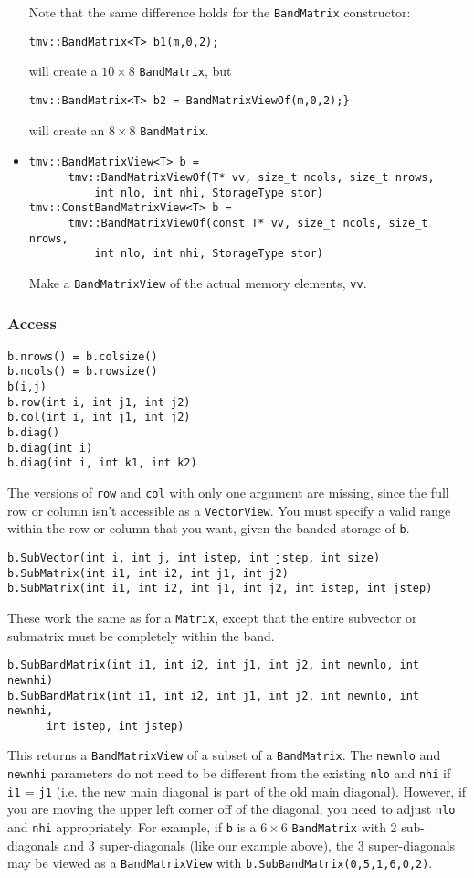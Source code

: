 \documentclass[twoside,letterpaper,11pt]{article}
\renewcommand{\tt}[1]{{\texttt {#1}}}
\begin{document}
\begin{itemize}
Note that the same difference holds for the \tt{BandMatrix} constructor:
\begin{verbatim}
tmv::BandMatrix<T> b1(m,0,2);
\end{verbatim}
will create a $10 \times 8$ \tt{BandMatrix}, but
\begin{verbatim}
tmv::BandMatrix<T> b2 = BandMatrixViewOf(m,0,2);}
\end{verbatim}
will create an $8 \times 8$ \tt{BandMatrix}.

\item
\begin{verbatim}
tmv::BandMatrixView<T> b = 
      tmv::BandMatrixViewOf(T* vv, size_t ncols, size_t nrows, 
          int nlo, int nhi, StorageType stor)
tmv::ConstBandMatrixView<T> b = 
      tmv::BandMatrixViewOf(const T* vv, size_t ncols, size_t nrows, 
          int nlo, int nhi, StorageType stor)
\end{verbatim}
Make a \tt{BandMatrixView} of the actual memory elements, \tt{vv}.

\end{itemize}

\subsubsection{Access}

\begin{verbatim}
b.nrows() = b.colsize()
b.ncols() = b.rowsize()
b(i,j)
b.row(int i, int j1, int j2)
b.col(int i, int j1, int j2)
b.diag()
b.diag(int i)
b.diag(int i, int k1, int k2)
\end{verbatim}
The versions of \tt{row} and \tt{col} with only one argument are
missing, since the full row or column isn't accessible as a \tt{VectorView}.
You must specify a valid range within the row or column that you want, 
given the banded storage of \tt{b}.

\begin{verbatim}
b.SubVector(int i, int j, int istep, int jstep, int size)
b.SubMatrix(int i1, int i2, int j1, int j2)
b.SubMatrix(int i1, int i2, int j1, int j2, int istep, int jstep)
\end{verbatim}
These work the same as for a \tt{Matrix}, except that the entire
subvector or submatrix must be completely within the band.

\begin{verbatim}
b.SubBandMatrix(int i1, int i2, int j1, int j2, int newnlo, int newnhi)
b.SubBandMatrix(int i1, int i2, int j1, int j2, int newnlo, int newnhi, 
      int istep, int jstep)
\end{verbatim}
This returns a \tt{BandMatrixView} of a subset of a \tt{BandMatrix}.
The \tt{newnlo} and \tt{newnhi} parameters do not need to be different
from the existing \tt{nlo} and \tt{nhi} if \tt{i1} = \tt{j1} 
(i.e. the new main diagonal
is part of the old main diagonal).  However, if you are moving the upper left
corner off of the diagonal, you need to adjust \tt{nlo} and \tt{nhi} appropriately.
For example, if \tt{b} is a $6 \times 6$ \tt{BandMatrix} with 2 sub-diagonals and 
3 super-diagonals
(like our example above), the 3 super-diagonals may be viewed as a \tt{BandMatrixView}
with \tt{b.SubBandMatrix(0,5,1,6,0,2)}.
\end{document}
